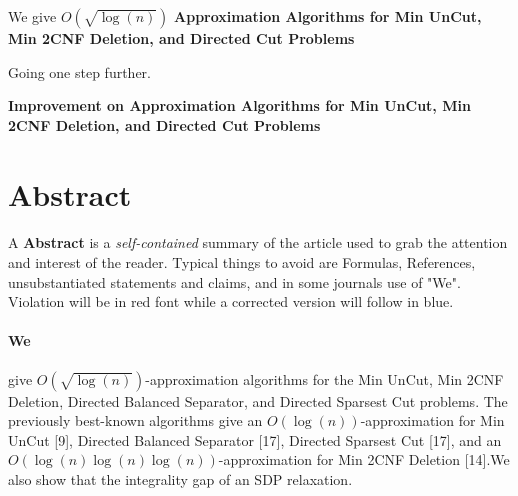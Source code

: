\documentclass[11pt]{article}
\begin{document}


\begin{center}
{\color{blue}We give} $O \! \left( \sqrt{\log(n)}\right)$ \textbf{Approximation 
Algorithms for Min UnCut, Min 2CNF Deletion, and Directed Cut Problems}
\end{center}

Going one step further.

\begin{center}
\textbf{Improvement on Approximation Algorithms for Min UnCut, Min 2CNF Deletion, 
and Directed Cut Problems}
\end{center}

\section{Abstract}
\paragraph{}
 A \textbf{Abstract} is a \emph{self-contained} summary of the 
article used to grab the attention and interest of the reader.
Typical things to avoid are Formulas, References, unsubstantiated 
statements and claims, and in some journals use of  
{\ttfamily"}We{\ttfamily"}.  Violation will be in {\color{red}red} font
while a corrected version will follow in {\color{blue}blue}.\\

\paragraph      
{\color{red}We} give {\color{red}$O \! (\sqrt{\log(n)})$}-approximation 
algorithms for the Min UnCut, Min 2CNF Deletion, Directed Balanced Separator, 
and Directed Sparsest Cut problems. The previously best-known algorithms 
give an {\color{red}$O \! (\log(n))$}-approximation for Min UnCut 
{\color{red}[9]}, {\color{red}Directed Balanced Separator [17]}, 
{\color{red}Directed Sparsest Cut [17]}, and an 
{\color{red}$O \! (\log(n) \log(n) \log(n) )$}-approximation for Min 2CNF 
Deletion {\color{red}[14]}.{\color{red}We} also show that the integrality gap of an 
SDP relaxation. \\
\end{document}
